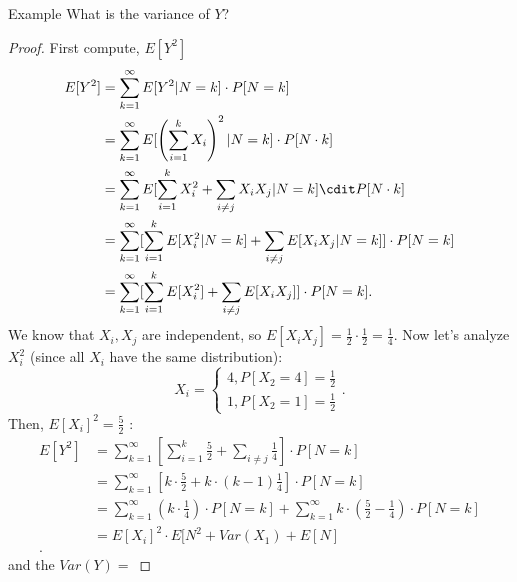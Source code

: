 \documentclass[a4paper]{article}
\begin{document}
\begin{note}{Example}
  What is the variance of $Y$?
  \begin{proof}
    First compute, $E[Y^2]$
    \begin{align*}
      E[Y^2] &= \sum_{k=1}^{\infty} E[Y^2 | N=k] \cdot P[N=k] \\
             &= \sum_{k=1}^{\infty} E[\left( \sum_{i=1}^{k} X_i \right)^{2} | N=k] \cdot P[N\cdot k] \\
             &= \sum_{k=1}^{\infty} E[\sum_{i=1}^{k} X_i^{2} + \sum_{i \neq j} X_i X_j | N=k] \cdit P[N \cdot k] \\
             &= \sum_{k=1}^{\infty} [\sum_{i=1}^{k} E[X_i^{2}| N=k] + \sum_{i\neq j} E[X_i X_j | N=k]] \cdot P[N=k] \\
             &= \sum_{k=1}^{\infty} [\sum_{i=1}^{k} E[X_i^{2}] + \sum_{i\neq j} E[X_i X_j]] \cdot P[N=k] 
    .\end{align*}
    We know that $X_i, X_j$ are independent, so $E[X_i X_j] = \frac{1}{2} \cdot \frac{1}{2} = \frac{1}{4}$. Now
    let's analyze $X_i^{2}$ (since all $X_i$ have the same distribution):
    \[
    X_i = \begin{cases}
      4, P[X_2 = 4] = \frac{1}{2} \\
      1, P[X_2 = 1] = \frac{1}{2}
    \end{cases}
    .\] 
    Then, $E[X_i]^{2}=\frac{5}{2}$ :
    \begin{align*}
      E[Y^2] &= \sum_{k=1}^{\infty} [\sum_{i=1}^{k} \frac{5}{2} + \sum_{i\neq j} \frac{1}{4}] \cdot P[N=k] \\
             &= \sum_{k=1}^{\infty} [k \cdot \frac{5}{2} + k \cdot (k-1) \frac{1}{4}] \cdot P[N=k] \\
             &= \sum_{k=1}^{\infty} (k \cdot \frac{1}{4}) \cdot P[N=k] + \sum_{k=1}^{\infty} k \cdot (\frac{5}{2}-\frac{1}{4}) \cdot P[N=k] \\
             &= E[X_i]^{2} \cdot E[N^{2} + Var(X_1) + E[N] \\
    .\end{align*}
    and the $Var(Y) = $
  \end{proof}
\end{note}
\end{document}
